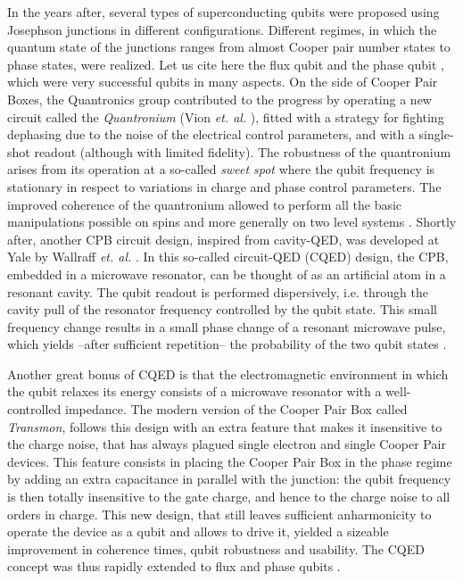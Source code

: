 In the years after, several types of superconducting qubits were proposed
using Josephson junctions in different configurations. Different regimes,
in which the quantum state of the junctions ranges from almost Cooper
pair number states to phase states, were realized. Let us cite here
the flux qubit \citep{mooij_josephson_1999, chiorescu_coherent_2003}
and the phase qubit \citep{martinis_rabi_2002}, which were very
successful qubits in many aspects. On the side of Cooper Pair Boxes,
the Quantronics group contributed to the progress by operating a
new circuit called the \textit{Quantronium} (Vion {\it et. al.} \citep{vion_manipulating_2002}),
fitted with a strategy for fighting dephasing due to the noise of
the electrical control parameters, and with a single-shot
readout (although with limited fidelity). The robustness of the quantronium
arises from its operation at a so-called {\it sweet spot} where the qubit
frequency is stationary in respect to variations in charge and phase control parameters. The improved coherence of
the quantronium allowed to perform all the basic manipulations possible
on spins and more generally on two level systems \citep{collin_nmr-like_2004}.
Shortly after, another CPB circuit design, inspired from
cavity-QED, was developed at Yale by Wallraff {\it et. al.} \citep{wallraff_strong_2004}.
In this so-called circuit-QED (CQED) design, the
CPB, embedded in a microwave resonator, can be thought of as an artificial
atom in a resonant cavity. The qubit readout is performed
dispersively, i.e. through the cavity pull of the resonator frequency
controlled by the qubit state. This small frequency change results
in a small phase change of a resonant microwave pulse, which yields
--after sufficient repetition-- the probability of the two qubit states
\citep{blais_cavity_2004}.

\smallskip{}


Another great bonus of CQED is that the electromagnetic
environment in which the qubit relaxes its energy consists of a microwave
resonator with a well-controlled impedance. The modern
version of the Cooper Pair Box called \textit{Transmon}, follows this
design with an extra feature that makes it insensitive to the charge
noise, that has always plagued single electron and single Cooper Pair devices.
This feature consists in placing the Cooper Pair
Box in the phase regime by adding an extra capacitance in
parallel with the junction: the qubit frequency is then
totally insensitive to the gate charge, and hence to the charge noise to all orders in charge.
This new design, that still leaves sufficient anharmonicity
to operate the device as a qubit and allows to drive it, yielded a
sizeable improvement in coherence times, qubit robustness and usability.
The CQED concept was thus rapidly extended to flux and phase qubits \citep{hofheinz_synthesizing_2009}.

